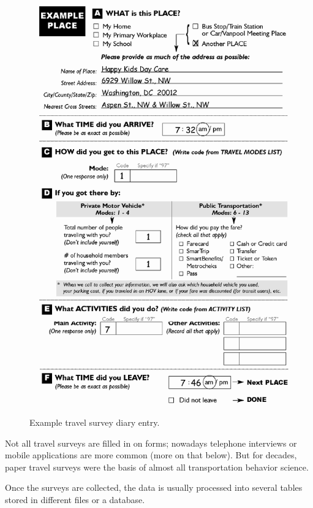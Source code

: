 \documentclass[]{book}
\begin{document}
\begin{figure}
\includegraphics[width=1\linewidth]{images/travel_diary} \caption{Example travel survey diary entry.}\label{fig:travel-diary}
\end{figure}

Not all travel surveys are filled in on forms; nowadays telephone interviews or
mobile applications are more common (more on that below). But for decades, paper
travel surveys were the basis of almost all transportation behavior science.

Once the surveys are collected, the data is usually processed into several tables
stored in different files or a database.
\end{document}
